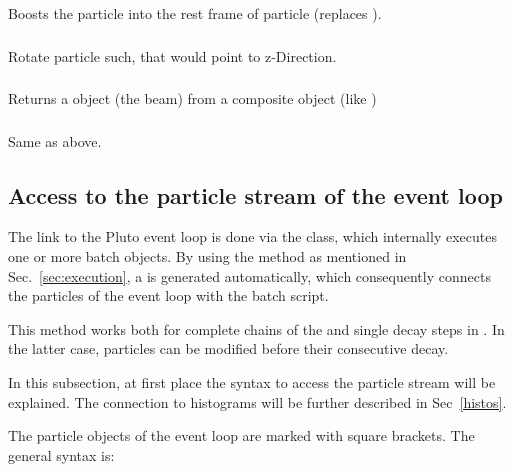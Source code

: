 {Boosts the particle  into the rest frame of  particle  
(replaces ).

\subsubsection{}

Rotate particle  such, that  would point to z-Direction.

\subsubsection{}

Returns a  object (the beam) from a composite object (like \s{[p+p]})

\subsubsection{}

Same as above.

\subsection{Access to the particle stream of the event loop}

The link to the Pluto event loop is done via the  class, which
internally executes one or more batch objects. By using the 
method as mentioned in Sec.~\ref{sec:execution}, a  is
generated automatically, which consequently connects the particles of
the event loop with the batch script.

This method works both for complete chains of the  and
single decay steps in . In the latter case, particles can
be modified before their consecutive decay.

In this subsection, at first place the syntax to access the particle
stream will be explained. The connection to histograms will be
further described in Sec~\ref{histos}.


The particle objects of the event loop are marked with square brackets. The
general syntax is:

}
